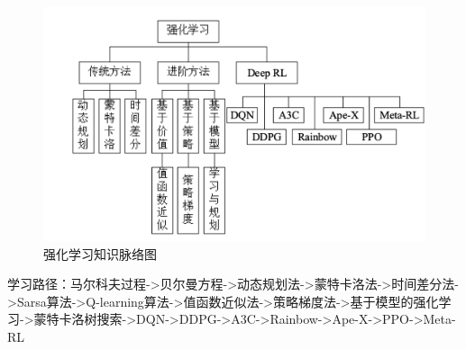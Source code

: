 \documentclass[lang=cn,11pt,a4paper]{eleganttemplate}
\begin{document}
\begin{figure}[htbp]
  \centering
  \includegraphics[width=1\textwidth]{image/rl_1.png}
  \caption{强化学习知识脉络图}
\end{figure}
学习路径：马尔科夫过程->贝尔曼方程->动态规划法->蒙特卡洛法->时间差分法->Sarsa算法->Q-learning算法->值函数近似法->策略梯度法->基于模型的强化学习->蒙特卡洛树搜索->DQN->DDPG->A3C->Rainbow->Ape-X->PPO->Meta-RL
\end{document}
